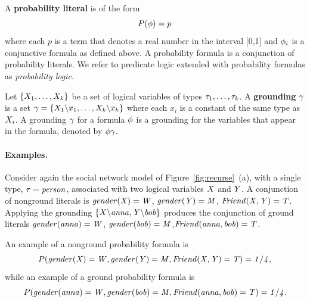 \documentclass[oribibl]{llncs}
\begin{document}
A \textbf{probability literal} is of the form 
$$
P(\phi) = p
$$
where each $p$ is a term that denotes a real number in the interval [0,1] and $\phi_{i}$ is a conjunctive formula as defined above. A probability formula is a conjunction of probability literals. We refer to predicate logic extended with probability formulas as {\em probability logic.} 


Let $\{X_{1},\ldots,X_{k}\}$ be a set of logical variables of types $\tau_{1},\ldots,\tau_{k}$. A \textbf{grounding} $\gamma$ %
is a set $\gamma = \{X_{1}\backslash x_{1},\ldots,X_{k} \backslash x_{k}\}$ where each $x_{i}$ is a constant of the same type as $X_{i}$. A grounding $\gamma$ for a formula $\phi$ is a grounding for the variables that appear in the formula, denoted by $\phi \gamma$. 



%
%

\paragraph{Examples.} Consider again the social network model of Figure~\ref{fig:recurse}~(a), with a single type, $\tau = \it{person}$, associated with two logical variables $X$ and $Y$. 
A conjunction of nonground literals is $\it{gender}(X) = W$, $\it{gender}(Y) = M$, $\it{Friend}(X,Y)=\mathit{T}$. Applying the grounding $\{X \backslash \it{anna}, Y \backslash \it{bob}\}$ produces the conjunction of ground literals $\it{gender}(\it{anna}) = W$, $\it{gender}(\it{bob}) = M$,$\it{Friend}(\it{anna},\it{bob})=\mathit{T}$. 

An example of a nonground probability formula  is $$P(\it{gender}(X) = W,\it{gender}(Y) = M, \it{Friend}(X,Y)=\mathit{T}) = 1/4,$$ while an example of a ground probability formula is $$P(\it{gender}(\it{anna}) = W, \it{gender}(\it{bob}) = M,\it{Friend}(\it{anna},\it{bob})=\mathit{T}) = 1/4.$$
\end{document}
